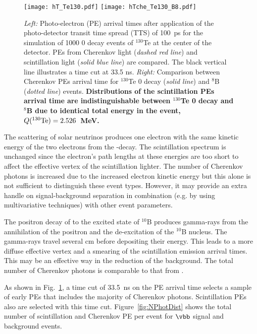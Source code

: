 \begin{figure*}[ht]
  \centering
  \texttt{[image: hT\_Te130.pdf]}
  \texttt{[image: hTche\_Te130\_B8.pdf]}
  \caption{\emph{Left:} Photo-electron (PE) arrival times after
    application of the photo-detector transit time spread (TTS) of
    100~ps for the simulation of 1000 0{\nbb} decay events of
    $^{130}$Te at the center of the detector. PEs from Cherenkov light
    (\emph{dashed red line}) and scintillation light (\emph{solid blue
      line}) are compared. The black vertical line illustrates a time
    cut at 33.5 ns. \emph{Right:} Comparison between Cherenkov PEs
    arrival time for $^{130}$Te {0\nbb} decay (\emph{solid line}) and
    $^{8}$B (\emph{dotted line}) events. {\bf Distributions of the
      scintillation PEs arrival time are indistinguishable between
      $^{130}$Te 0{\nbb} decay and $^8$B due to identical total energy
      in the event, $Q(^{130}{\rm Te})=2.526$~MeV.} }
\label{fig:ArrivalTimeDist}
\end{figure*}

The scattering of \B solar neutrinos produces one electron with the same kinetic energy of the two electrons from the \bb-decay. The scintillation spectrum is unchanged since the electron's path lengths at these energies are too short to affect the effective vertex of the scintillation lighter. The number of Cherenkov photons is increased due to the increased electron kinetic energy but this alone is not sufficient to distinguish these event types. However, it may provide an extra handle on signal-background separation in combination (e.g. by using multivariative techniques) with other event parameters.

The positron decay of \C to the excited state of $^{10}$B produces gamma-rays from the annihilation of the positron and the de-excitation of the $^{10}$B nucleus. The gamma-rays travel several cm before depositing their energy. This leads to a more diffuse effective vertex and a smearing of the scintillation emission arrival times. This may be an effective way in the reduction of the \C background. The total number of Cherenkov photons is comparable to that from \nbb.

As shown in Fig.~\ref{fig:ArrivalTimeDist}, a time cut of 33.5~ns on the PE arrival time selects a sample of early PEs that includes the majority of Cherenkov photons. Scintillation PEs also are selected with this time cut. Figure~\ref{fig:NPhotDist} shows the total number of scintillation and Cherenkov PE per event for $\vbb$ signal and \B background events. 

